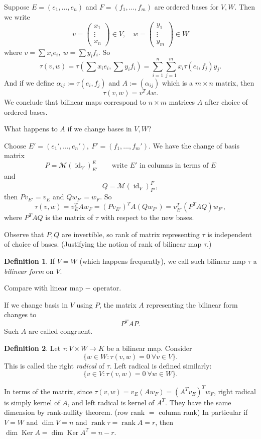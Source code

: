 \documentclass[a4paper]{article}
\newcommand{\Ker}{\operatorname{Ker}}
\newcommand{\id}{\operatorname{id}}
\newcommand{\rank}{\operatorname{rank}}
\theoremstyle{definition}
\newtheorem{defn}{Definition}[subsection]
\begin{document}
Suppose $E=(e_1,\ldots,e_n)$ and $F=(f_1,\ldots,f_m)$ are ordered bases for $V,W$. Then we write
\[
v=\begin{pmatrix}x_1\\ \vdots  \\ x_n\end{pmatrix} \in V,\quad w=\begin{pmatrix}y_1\\ \vdots  \\ y_m\end{pmatrix}\in W
\]
where $v=\sum x_i e_i,\ w=\sum y_i f_i$. So
\[
\tau (v,w) = \tau \left(\sum x_i e_i, \sum y_i f_i \right)=\sum_{i=1}^n \sum_{j=1}^m x_i \tau (e_i,f_j) y_j .
\]
And if we define $\alpha_{ij} := \tau (e_i,f_j)$ and $A:= \left(\alpha_{ij}\right)$ which is a $m\times n$ matrix, then
\[
\tau (v,w)=v^T Aw .
\]
We conclude that bilinear maps correspond to $n\times m$ matrices $A$ after choice of ordered bases.

What happens to $A$ if we change bases in $V,W$?

Choose $E'=(e_1',\ldots,e_n'),\ F'=(f_1,\ldots,f_m')$. We have the change of basis matrix
\[
P=\mathcal M (\id _V)_{E'}^E \qquad \text{write }E' \text{ in columns in terms of }E
\]
and
\[
Q=\mathcal M (\id _V)_{F'}^F,
\]
then $Pv_{E'} = v_E$ and $Qw_{F'}=w_F$. So
\[
\tau (v,w) = v_E^T A w_F= \left(P v_{E'} \right)^T A \left(Qw_{F'} \right)=v_{E'}^T \left(P^T AQ\right)w_{F'} ,
\]
where $P^T AQ$ is the matrix of $\tau$ with respect to the new bases.

Observe that $P,Q$ are invertible, so rank of matrix representing $\tau$ is independent of choice of bases. (Justifying the notion of rank of bilinear map $\tau$.)

\begin{defn}
    If $V=W$ (which happens frequently), we call such bilinear map $\tau$ a \textit{bilinear form} on $V$.
\end{defn}
Compare with linear map $-$ operator.

If we change basis in $V$ using $P$, the matrix $A$ representing the bilinear form changes to
\[
P^TAP .
\]
Such $A$ are called congruent.

\begin{defn}
    Let $\tau :V\times W\rightarrow K$ be a bilinear map. Consider
\[
\{w\in W: \tau (v,w)=0 \ \forall v\in V\}.
\]
This is called the right \textit{radical} of $\tau$. Left radical is defined similarly:
\[
\{v\in V:\tau(v,w)=0 \ \forall w\in W\} .
\]
\end{defn}
In terms of the matrix, since $\tau (v,w)=v_E \left(Aw_F\right)=\left(A^T v_E\right)^T w_F$, right radical is simply kernel of $A$, and left radical is kernel of $A^T$. They have the same dimension by rank-nullity theorem. (row rank $=$ column rank) In particular if $V=W$ and $\dim V=n$ and $\rank \tau =\rank A=r$, then $\dim \Ker A =\dim \Ker A^T=n-r$. \\
\end{document}
